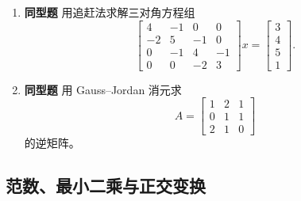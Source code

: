 \documentclass{article}
\newcommand{\simtag}{\textcolor{blue!65!black}{\textbf{同型题}}}
\begin{document}
\begin{enumerate}
  \item \simtag{} 用追赶法求解三对角方程组
  \[
    \begin{bmatrix}
      4&-1&0&0\\
      -2&5&-1&0\\
      0&-1&4&-1\\
      0&0&-2&3
    \end{bmatrix}
    x=
    \begin{bmatrix}3\\4\\5\\1\end{bmatrix}.
  \]

  \item \simtag{} 用 Gauss--Jordan 消元求
  \[
    A=\begin{bmatrix}1&2&1\\0&1&1\\2&1&0\end{bmatrix}
  \]
  的逆矩阵。
\end{enumerate}

\subsection{范数、最小二乘与正交变换}
\end{document}
